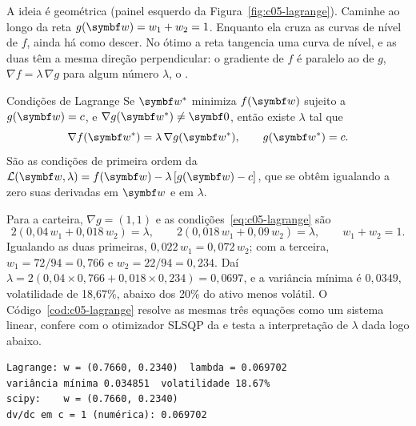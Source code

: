 A ideia é geométrica (painel esquerdo da Figura~\ref{fig:c05-lagrange}). Caminhe ao longo da reta $g(\vetor{w}) = w_1 + w_2 = 1$. Enquanto ela cruza as curvas de nível de $f$, ainda há como descer. No ótimo a reta tangencia uma curva de nível, e as duas têm a mesma direção perpendicular: o gradiente de $f$ é paralelo ao de $g$, $\nabla f = \lambda\,\nabla g$ para algum número $\lambda$, o .

\begin{resultado}{Condições de Lagrange}
Se $\vetor{w}^{\ast}$ minimiza $f(\vetor{w})$ sujeito a $g(\vetor{w}) = c$, e $\nabla g(\vetor{w}^{\ast}) \neq \vetor{0}$, então existe $\lambda$ tal que
\begin{equation}
  \nabla f(\vetor{w}^{\ast}) = \lambda\,\nabla g(\vetor{w}^{\ast}) , \qquad g(\vetor{w}^{\ast}) = c .
  \label{eq:c05-lagrange}
\end{equation}
São as condições de primeira ordem da  $\mathcal{L}(\vetor{w}, \lambda) = f(\vetor{w}) - \lambda\,[g(\vetor{w}) - c]$, que se obtêm igualando a zero suas derivadas em $\vetor{w}$ e em $\lambda$.
\end{resultado}

Para a carteira, $\nabla g = (1, 1)$ e as condições~\eqref{eq:c05-lagrange} são
\[
  2(0,04\,w_1 + 0,018\,w_2) = \lambda , \qquad 2(0,018\,w_1 + 0,09\,w_2) = \lambda , \qquad w_1 + w_2 = 1 .
\]
Igualando as duas primeiras, $0,022\,w_1 = 0,072\,w_2$; com a terceira, $w_1 = 72/94 = 0,766$ e $w_2 = 22/94 = 0,234$. Daí $\lambda = 2(0,04 \times 0,766 + 0,018 \times 0,234) = 0,0697$, e a variância mínima é $0,0349$, volatilidade de 18,67\%, abaixo dos 20\% do ativo menos volátil. O Código~\ref{cod:c05-lagrange} resolve as mesmas três equações como um sistema linear, confere com o otimizador SLSQP da  e testa a interpretação de $\lambda$ dada logo abaixo.


\begin{lstlisting}[style=saida]
Lagrange: w = (0.7660, 0.2340)  lambda = 0.069702
variância mínima 0.034851  volatilidade 18.67%
scipy:    w = (0.7660, 0.2340)
dv/dc em c = 1 (numérica): 0.069702
\end{lstlisting}

